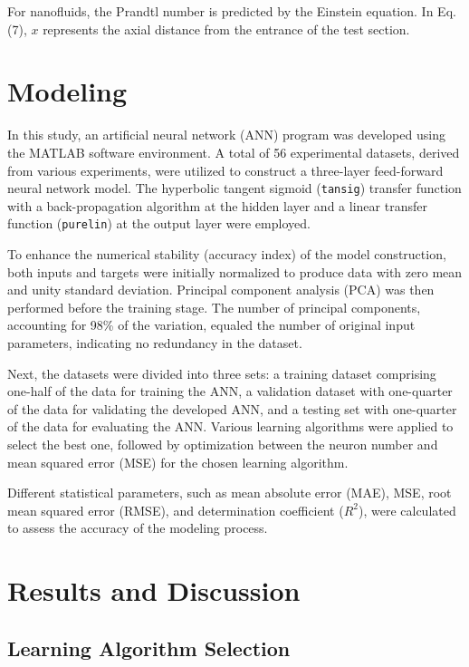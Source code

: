 \documentclass{article}
\begin{document}
For nanofluids, the Prandtl number is predicted by the Einstein equation. In Eq. (7), $x$ represents the axial distance from the entrance of the test section.



\section{Modeling}

In this study, an artificial neural network (ANN) program was developed using the MATLAB software environment. A total of 56 experimental datasets, derived from various experiments, were utilized to construct a three-layer feed-forward neural network model. The hyperbolic tangent sigmoid (\texttt{tansig}) transfer function with a back-propagation algorithm at the hidden layer and a linear transfer function (\texttt{purelin}) at the output layer were employed.

To enhance the numerical stability (accuracy index) of the model construction, both inputs and targets were initially normalized to produce data with zero mean and unity standard deviation. Principal component analysis (PCA) was then performed before the training stage. The number of principal components, accounting for 98\% of the variation, equaled the number of original input parameters, indicating no redundancy in the dataset.

Next, the datasets were divided into three sets: a training dataset comprising one-half of the data for training the ANN, a validation dataset with one-quarter of the data for validating the developed ANN, and a testing set with one-quarter of the data for evaluating the ANN. Various learning algorithms were applied to select the best one, followed by optimization between the neuron number and mean squared error (MSE) for the chosen learning algorithm.

Different statistical parameters, such as mean absolute error (MAE), MSE, root mean squared error (RMSE), and determination coefficient ($R^2$), were calculated to assess the accuracy of the modeling process.



\section{Results and Discussion}

\subsection{Learning Algorithm Selection}
\end{document}
